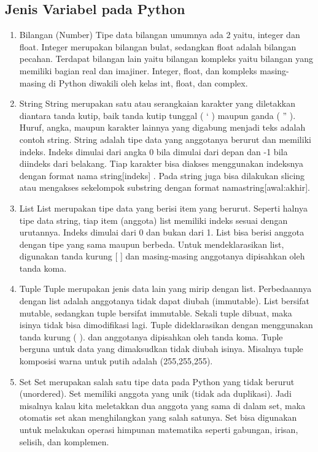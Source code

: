 \subsection{Jenis Variabel pada Python}
\begin{enumerate}
\item
Bilangan (Number)
Tipe data bilangan umumnya ada 2 yaitu, integer dan float. Integer merupakan bilangan bulat, sedangkan float adalah bilangan pecahan. Terdapat bilangan lain yaitu bilangan kompleks yaitu bilangan yang memiliki bagian real dan imajiner. Integer, float, dan kompleks masing-masing di Python diwakili oleh kelas int, float, dan complex.
\item
String
String merupakan satu atau serangkaian karakter yang diletakkan diantara tanda kutip, baik tanda kutip tunggal ( ‘ ) maupun ganda ( ” ). Huruf, angka, maupun karakter lainnya yang digabung menjadi teks adalah contoh string.
String adalah tipe data yang anggotanya berurut dan memiliki indeks. Indeks dimulai dari angka 0 bila dimulai dari depan dan -1 bila diindeks dari belakang. Tiap karakter bisa diakses menggunakan indeksnya dengan format nama string[indeks] . Pada string juga bisa dilakukan slicing atau mengakses sekelompok substring dengan format namastring[awal:akhir].
\item
List
List merupakan tipe data yang berisi item yang berurut. Seperti halnya tipe data string, tiap item (anggota) list memiliki indeks sesuai dengan urutannya. Indeks dimulai dari 0 dan bukan dari 1.
List bisa berisi anggota dengan tipe yang sama maupun berbeda. Untuk mendeklarasikan list, digunakan tanda kurung [ ] dan masing-masing anggotanya dipisahkan oleh tanda koma.
\item
Tuple
Tuple merupakan jenis data lain yang mirip dengan list. Perbedaannya dengan list adalah anggotanya tidak dapat diubah (immutable). List bersifat mutable, sedangkan tuple bersifat immutable. Sekali tuple dibuat, maka isinya tidak bisa dimodifikasi lagi.
Tuple dideklarasikan dengan menggunakan tanda kurung ( ). dan anggotanya dipisahkan oleh tanda koma. Tuple berguna untuk data yang dimaksudkan tidak diubah isinya. Misalnya tuple komposisi warna untuk putih adalah (255,255,255).
\item
Set
Set merupakan salah satu tipe data pada Python yang tidak berurut (unordered). Set memiliki anggota yang unik (tidak ada duplikasi). Jadi misalnya kalau kita meletakkan dua anggota yang sama di dalam set, maka otomatis set akan menghilangkan yang salah satunya.
Set bisa digunakan untuk melakukan operasi himpunan matematika seperti gabungan, irisan, selisih, dan komplemen.

\end{enumerate}
